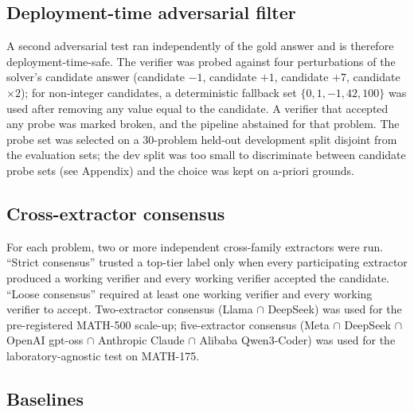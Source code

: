 \documentclass[11pt]{article}
\begin{document}
\subsection{Deployment-time adversarial filter}

A second adversarial test ran independently of the gold answer and is therefore deployment-time-safe. The verifier was probed against four perturbations of the solver's candidate answer (candidate $-1$, candidate $+1$, candidate $+7$, candidate $\times 2$); for non-integer candidates, a deterministic fallback set $\{0, 1, -1, 42, 100\}$ was used after removing any value equal to the candidate. A verifier that accepted any probe was marked broken, and the pipeline abstained for that problem. The probe set was selected on a 30-problem held-out development split disjoint from the evaluation sets; the dev split was too small to discriminate between candidate probe sets (see Appendix) and the choice was kept on a-priori grounds.

\subsection{Cross-extractor consensus}

For each problem, two or more independent cross-family extractors were run. ``Strict consensus'' trusted a top-tier label only when every participating extractor produced a working verifier and every working verifier accepted the candidate. ``Loose consensus'' required at least one working verifier and every working verifier to accept. Two-extractor consensus (Llama $\cap$ DeepSeek) was used for the pre-registered MATH-500 scale-up; five-extractor consensus (Meta $\cap$ DeepSeek $\cap$ OpenAI gpt-oss $\cap$ Anthropic Claude $\cap$ Alibaba Qwen3-Coder) was used for the laboratory-agnostic test on MATH-175.

\subsection{Baselines}
\end{document}
